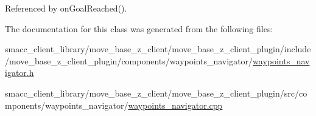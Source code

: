 Referenced by on\+Goal\+Reached().



The documentation for this class was generated from the following files\+:\begin{DoxyCompactItemize}
\item 
smacc\+\_\+client\+\_\+library/move\+\_\+base\+\_\+z\+\_\+client/move\+\_\+base\+\_\+z\+\_\+client\+\_\+plugin/include/move\+\_\+base\+\_\+z\+\_\+client\+\_\+plugin/components/waypoints\+\_\+navigator/\hyperlink{waypoints__navigator_8h}{waypoints\+\_\+navigator.\+h}\item 
smacc\+\_\+client\+\_\+library/move\+\_\+base\+\_\+z\+\_\+client/move\+\_\+base\+\_\+z\+\_\+client\+\_\+plugin/src/components/waypoints\+\_\+navigator/\hyperlink{waypoints__navigator_8cpp}{waypoints\+\_\+navigator.\+cpp}\end{DoxyCompactItemize}
